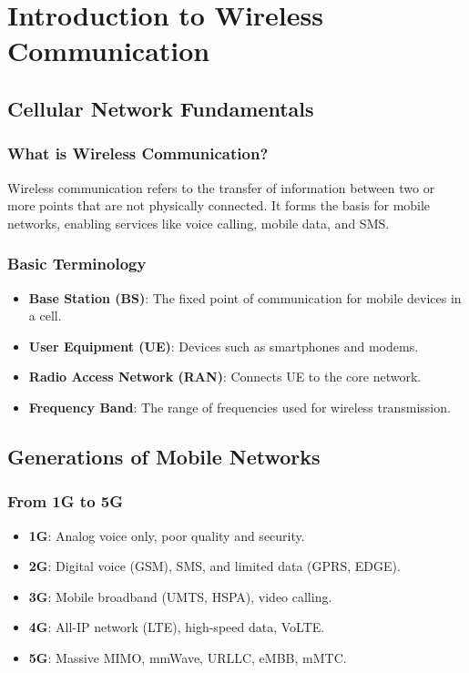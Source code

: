 


\chapter{Introduction to Wireless Communication}

\section{Cellular Network Fundamentals}

\subsection{What is Wireless Communication?}
Wireless communication refers to the transfer of information between two or more points that are not physically connected. It forms the basis for mobile networks, enabling services like voice calling, mobile data, and SMS.

\subsection{Basic Terminology}
\begin{itemize}
    \item \textbf{Base Station (BS)}: The fixed point of communication for mobile devices in a cell.
    \item \textbf{User Equipment (UE)}: Devices such as smartphones and modems.
    \item \textbf{Radio Access Network (RAN)}: Connects UE to the core network.
    \item \textbf{Frequency Band}: The range of frequencies used for wireless transmission.
\end{itemize}

\section{Generations of Mobile Networks}

\subsection{From 1G to 5G}
\begin{itemize}
    \item \textbf{1G}: Analog voice only, poor quality and security.
    \item \textbf{2G}: Digital voice (GSM), SMS, and limited data (GPRS, EDGE).
    \item \textbf{3G}: Mobile broadband (UMTS, HSPA), video calling.
    \item \textbf{4G}: All-IP network (LTE), high-speed data, VoLTE.
    \item \textbf{5G}: Massive MIMO, mmWave, URLLC, eMBB, mMTC.
\end{itemize}

